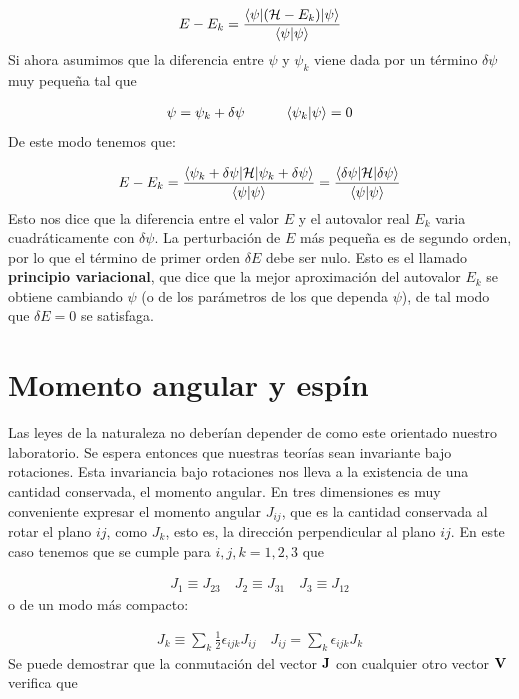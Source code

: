 \begin{eqnarray}
	E-E_k = \frac{\langle \psi |(\mathcal{H}-E_k)|\psi \rangle}{\langle \psi |\psi \rangle}
\end{eqnarray}
Si ahora asumimos que la diferencia entre $\psi$ y $\psi_k$ viene dada por un término $\delta\psi$ muy pequeña tal que

\begin{eqnarray}
	\psi = \psi_k + \delta \psi \quad \quad \quad \langle \psi_k |\psi \rangle = 0
\end{eqnarray}
De este modo tenemos que:

\begin{eqnarray}
	E-E_k =  \frac{\langle \psi_k + \delta \psi |\mathcal{H} |\psi_k + \delta \psi \rangle}{\langle \psi |\psi \rangle} =  \frac{\langle \delta \psi |\mathcal{H} |\delta \psi \rangle}{\langle \psi |\psi \rangle}
\end{eqnarray}
Esto nos dice que la diferencia entre el valor $E$ y el autovalor real $E_k$ varia cuadráticamente con $\delta \psi$. La perturbación de $E$ más pequeña es de segundo orden, por lo que el término de primer orden $\delta E$ debe ser nulo. Esto es el llamado \textbf{principio variacional}, que dice que la mejor aproximación del autovalor $E_k$ se obtiene cambiando $\psi$ (o de los parámetros de los que dependa $\psi$), de tal modo que $\delta E=0$ se satisfaga. \\


\section{Momento angular y espín}

Las leyes de la naturaleza no deberían depender de como este orientado nuestro laboratorio. Se espera entonces que nuestras teorías sean invariante bajo rotaciones. Esta invariancia bajo rotaciones nos lleva a la existencia de una cantidad conservada, el momento angular. En tres dimensiones es muy conveniente expresar el momento angular $J_{ij}$, que es la cantidad conservada al rotar el plano $ij$, como $J_{k}$, esto es, la dirección perpendicular al plano $ij$. En este caso tenemos que se cumple para $i,j,k=1,2,3$ que 

\begin{eqnarray}
	J_1 \equiv J_{23} \quad J_2 \equiv J_{31} \quad J_3 \equiv J_{12}
\end{eqnarray}
o de un modo más compacto:

\begin{eqnarray}
	J_k \equiv \sum_k \frac{1}{2} \epsilon_{ijk} J_{ij} \quad J_{ij} = \sum_k \epsilon_{ijk} J_k
\end{eqnarray}
Se puede demostrar que la conmutación del vector $\mathbf{J}$ con cualquier otro vector $\mathbf{V}$ verifica que

